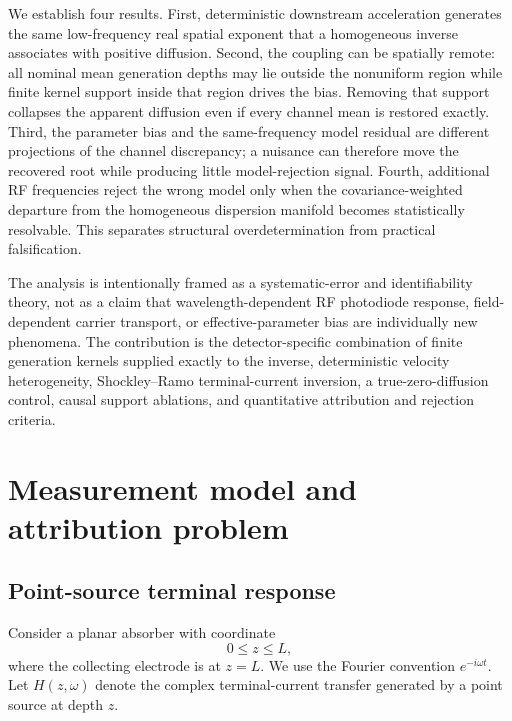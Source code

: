 \documentclass[aps,pra,twocolumn,superscriptaddress,nofootinbib]{revtex4-2}
\begin{document}
We establish four results. First, deterministic downstream acceleration generates the same low-frequency real spatial exponent that a homogeneous inverse associates with positive diffusion. Second, the coupling can be spatially remote: all nominal mean generation depths may lie outside the nonuniform region while finite kernel support inside that region drives the bias. Removing that support collapses the apparent diffusion even if every channel mean is restored exactly. Third, the parameter bias and the same-frequency model residual are different projections of the channel discrepancy; a nuisance can therefore move the recovered root while producing little model-rejection signal. Fourth, additional RF frequencies reject the wrong model only when the covariance-weighted departure from the homogeneous dispersion manifold becomes statistically resolvable. This separates structural overdetermination from practical falsification.

The analysis is intentionally framed as a systematic-error and identifiability theory, not as a claim that wavelength-dependent RF photodiode response, field-dependent carrier transport, or effective-parameter bias are individually new phenomena. The contribution is the detector-specific combination of finite generation kernels supplied exactly to the inverse, deterministic velocity heterogeneity, Shockley--Ramo terminal-current inversion, a true-zero-diffusion control, causal support ablations, and quantitative attribution and rejection criteria.

\section{Measurement model and attribution problem}
\label{sec:model}

\subsection{Point-source terminal response}

Consider a planar absorber with coordinate
\begin{equation}
0\le z\le L,
\end{equation}
where the collecting electrode is at $z=L$. We use the Fourier convention $e^{-i\omega t}$. Let $H(z,\omega)$ denote the complex terminal-current transfer generated by a point source at depth $z$.
\end{document}
